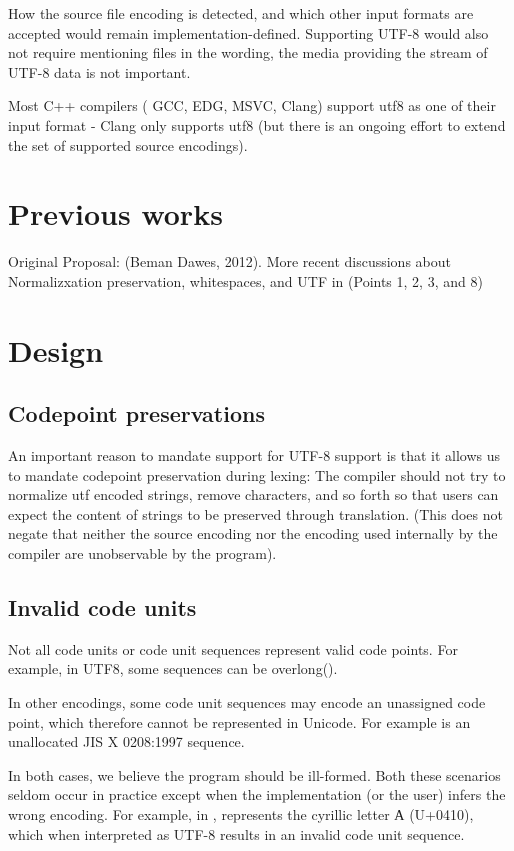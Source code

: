 \documentclass{wg21}
\begin{document}
How the source file encoding is detected, and which other input formats are accepted would remain implementation-defined.
Supporting UTF-8 would also not require mentioning files in the wording, the media providing the stream of UTF-8 data is not important.

Most C++ compilers ( GCC, EDG, MSVC, Clang) support utf8 as one of their input format - Clang only supports utf8 (but there is an ongoing effort to extend the set of supported
source encodings).

\section{Previous works}

Original Proposal:  (Beman Dawes, 2012).
More recent discussions about Normalizxation preservation, whitespaces, and UTF in  (Points 1, 2, 3, and 8)

\section{Design}

\subsection{Codepoint preservations}

An important reason to mandate support for UTF-8 support is that it allows us to mandate codepoint preservation during lexing:
The compiler should not try to normalize utf encoded strings, remove characters, and so forth so that users can expect the content
of strings to be preserved through translation.
(This does not negate that neither the source encoding nor the encoding used internally by the compiler are unobservable by the program).

\subsection{Invalid code units}

Not all code units or code unit sequences represent valid code points.
For example, in UTF8, some sequences can be overlong().

In other encodings, some code unit sequences may encode an unassigned code point, which therefore cannot be represented in Unicode.
For example  is an unallocated JIS X 0208:1997 sequence.

In both cases, we believe the program should be ill-formed.
Both these scenarios seldom occur in practice except when the implementation (or the user) infers the wrong encoding.
For example, in ,  represents the cyrillic letter А (U+0410), which when interpreted
as UTF-8 results in an invalid code unit sequence.
\end{document}
